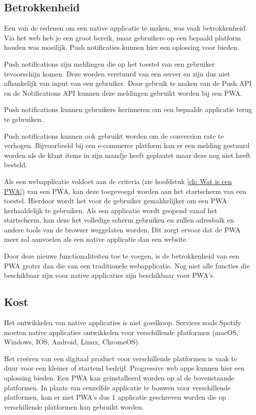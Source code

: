 	
\subsection{Betrokkenheid}
	Een van de redenen om een native applicatie te maken, was vaak betrokkenheid. Via het web heb je een groot bereik, maar gebruikers op een bepaald platform houden was moeilijk. Push notificaties kunnen hier een oplossing voor bieden.
	\autocite{Google2019}

	Push notifications zijn meldingen die op het toestel van een gebruiker tevoorschijn komen. Deze worden verstuurd van een server en zijn dus niet afhankelijk van input van een gebruiker. Door gebruik te maken van de Push API en de Notifications API kunnen deze meldingen gebruikt worden bij een PWA.
	
	Push notifications kunnen gebruikers herinneren om een bepaalde applicatie terug te gebruiken. 
	\autocite{Hiltunen2018}
	
	Push notifications kunnen ook gebruikt worden om de conversion rate te verhogen. Bijvoorbeeld bij een e-commerce platform kan er een melding gestuurd worden als de klant items in zijn mandje heeft geplaatst maar deze nog niet heeft besteld.
	\autocite{Gaunt2020}

	Als een webapplicatie voldoet aan de criteria (zie hoofdstuk \ref{ch: Wat is een PWA}) van een PWA, kan deze toegevoegd worden aan het startscherm van een toestel. Hierdoor wordt het voor de gebruiker gemakkelijker om een PWA herhaaldelijk te gebruiken. Als een applicatie wordt geopend vanaf het startscherm, kan deze het volledige scherm gebruiken en zullen adresbalk en andere tools van de browser weggelaten worden. Dit zorgt ervoor dat de PWA meer zal aanvoelen als een native applicatie dan een website.
	
	Door deze nieuwe functionaliteiten toe te voegen, is de betrokkenheid van een PWA groter dan die van een traditionele webapplicatie. Nog niet alle functies die beschikbaar zijn voor native applicaties zijn beschikbaar voor PWA's.
	

\subsection{Kost}
	Het ontwikkelen van native applicaties is niet goedkoop. Services zoals Spotify moeten native applicaties ontwikkelen voor verschillende platformen (macOS, Windows, IOS, Android, Linux, ChromeOS).
	
	Het creëren van een digitaal product voor verschillende platformen is vaak te duur voor een kleiner of startend bedrijf. Progressive web apps kunnen hier een oplossing bieden. Een PWA kan geïnstalleerd worden op al de bovenstaande platformen. In plaats van eenzelfde applicatie te bouwen voor verschillende platformen, kan er met PWA's dus 1 applicatie geschreven worden die op verschillende platformen kan gebruikt worden.
	
